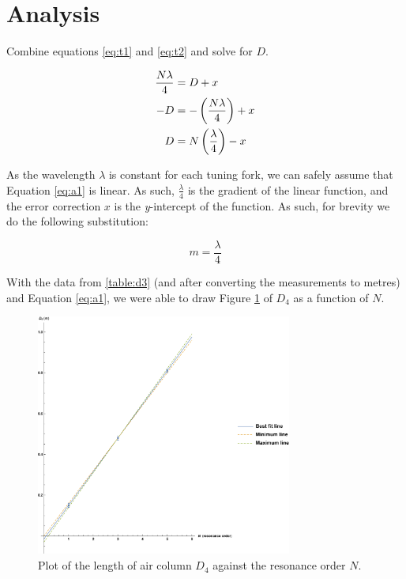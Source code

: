 \documentclass[letter]{article}
\numberwithin{equation}{section}
\numberwithin{figure}{section}
\numberwithin{table}{section}
\begin{document}
\section{Analysis}
Combine equations \eqref{eq:t1} and \eqref{eq:t2} and solve for \(D\).

\begin{align} \label{eq:a1}
  \frac{N \lambda}{4} &= D + x \notag \\
  -D &= - \left (\frac{N \lambda}{4} \right) + x \notag \\
  D &= N \left(\frac{\lambda}{4} \right) - x
\end{align}

As the wavelength \(\lambda\) is constant for each tuning fork, we can safely assume that Equation \eqref{eq:a1} is linear. As such, \(\frac{\lambda}{4}\) is the gradient of the linear function, and the error correction \(x\) is the \textit{y}-intercept of the function. As such, for brevity we do the following substitution:

\begin{equation} \label{eq:a2}
  m = \frac{\lambda}{4}
\end{equation}  

With the data from \ref{table:d3} (and after converting the measurements to metres) and Equation \eqref{eq:a1}, we were able to draw Figure \ref{fig:plot1} of \(D_4\) as a function of \(N\).

\begin{figure}[!h]
  \centering
  \includegraphics[width=0.75\textwidth]{plot_pdf.png}
  \caption{Plot of the length of air column \(D_4\) against the resonance order \(N\).}
  \label{fig:plot1}
\end{figure}
\end{document}
